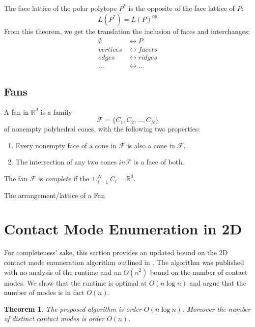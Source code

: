 \documentclass[conference]{IEEEtran}
\newtheorem{theorem}{Theorem}
\begin{document}
The face lattice of the polar polytope $P^*$ is the opposite of the face lattice of $P$:
\begin{equation}
    L(P^*) = L(P)^{op}
\end{equation}
From this theorem, we get the translation the inclusion of faces and interchanges:
\begin{align}
    \emptyset &\longleftrightarrow P \\
    vertices &\longleftrightarrow facets \\
    edges &\longleftrightarrow ridges \\
    ... &\longleftrightarrow ...
\end{align}

\subsection{Fans}
A fan in $\mathbb{R}^d$ is a family 
\begin{equation}
    \mathcal{F} = \{C_1, C_2, \hdots, C_N\}
\end{equation}
of nonempty polyhedral cones, with the following two properties:
\begin{enumerate}
    \item Every nonempty face of a cone in $\mathcal{F}$ is also a cone in $\mathcal{F}$.
    \item The intersection of any two cones $in \mathcal{F}$ is a face of both.
\end{enumerate}
The fan $\mathcal{F}$ is \textit{complete} if the $\cup_{i=1}^N C_i = \mathbb{R}^d$.

The arrangement/lattice of a Fan

\section{Contact Mode Enumeration in 2D}

For completeness' sake, this section provides an updated bound on the 2D contact
mode enumeration algorithm outlined in \citet{Mason}. The algorithm was
published with no analysis of the runtime and an $O(n^2)$ bound on the number of
contact modes. We show that the runtime is optimal at $O(n\log n)$ and argue
that the number of modes is in fact $O(n)$. 

\begin{theorem}
    The proposed algorithm is order $O(n\log n)$. Moreover the number of
    distinct contact modes is order $O(n)$.
\end{theorem}
\end{document}
